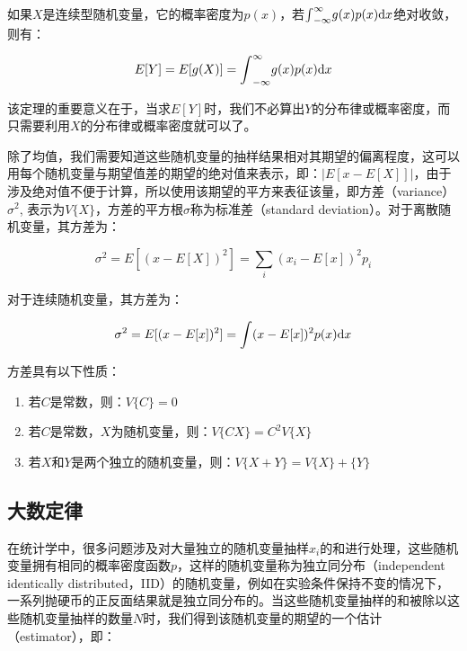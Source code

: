 如果$X$是连续型随机变量，它的概率密度为$p(x)$，若${\rm \int}^{\infty}_{-\infty}g(x)p(x){\rm d}x$绝对收敛，则有：

\begin{equation}
	E[Y]=E[g(X)]={\rm \int}^{\infty}_{-\infty}g(x)p(x){\rm d}x
\end{equation}

该定理的重要意义在于，当求$E[Y]$时，我们不必算出$Y$的分布律或概率密度，而只需要利用$X$的分布律或概率密度就可以了。

除了均值，我们需要知道这些随机变量的抽样结果相对其期望的偏离程度，这可以用每个随机变量与期望值差的期望的绝对值来表示，即：$|E[x-E[X]]|$，由于涉及绝对值不便于计算，所以使用该期望的平方来表征该量，即方差（variance）$\sigma^2$, 表示为$V\{X\}$，方差的平方根$\sigma$称为标准差（standard deviation）。对于离散随机变量，其方差为：

\begin{equation}
	\sigma^2=E[(x-E[X])^2]=\sum_i (x_i-E[x])^2p_i
\end{equation}

\noindent 对于连续随机变量，其方差为：

\begin{equation}\label{e:discrete-variance}
	\sigma^2=E[(x-E[x])^2]={\rm \int} (x-E[x])^2 p(x){\rm d}x
\end{equation}

方差具有以下性质：
\begin{enumerate}
	\item 若$C$是常数，则：$V\{C\}=0$
	\item 若$C$是常数，$X$为随机变量，则：$V\{CX\}=C^2V\{X\}$
	\item 若$X$和$Y$是两个独立的随机变量，则：$V\{X+Y\}=V\{X\}+\{Y\}$
\end{enumerate}



\subsection{大数定律}
在统计学中，很多问题涉及对大量独立的随机变量抽样$x_i$的和进行处理，这些随机变量拥有相同的概率密度函数$p$，这样的随机变量称为独立同分布（independent identically distributed，IID）的随机变量，例如在实验条件保持不变的情况下，一系列抛硬币的正反面结果就是独立同分布的。当这些随机变量抽样的和被除以这些随机变量抽样的数量$N$时，我们得到该随机变量的期望的一个估计（estimator），即：

